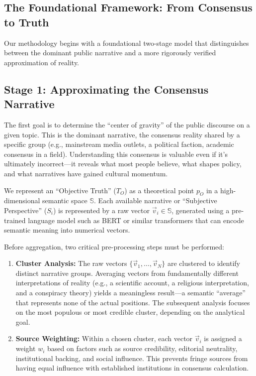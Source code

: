 \documentclass[11pt,a4paper]{article}
\begin{document}
\begin{small}
\section{The Foundational Framework: From Consensus to Truth}

Our methodology begins with a foundational two-stage model that distinguishes between the dominant public narrative and a more rigorously verified approximation of reality.

\subsection{Stage 1: Approximating the Consensus Narrative}

The first goal is to determine the ``center of gravity'' of the public discourse on a given topic. This is the dominant narrative, the consensus reality shared by a specific group (e.g., mainstream media outlets, a political faction, academic consensus in a field). Understanding this consensus is valuable even if it's ultimately incorrect---it reveals what most people believe, what shapes policy, and what narratives have gained cultural momentum.

We represent an ``Objective Truth'' ($T_O$) as a theoretical point $p_O$ in a high-dimensional semantic space $\mathbb{S}$. Each available narrative or ``Subjective Perspective'' ($S_i$) is represented by a raw vector $\vec{v}_i \in \mathbb{S}$, generated using a pre-trained language model such as BERT \citep{Devlin2018} or similar transformers that can encode semantic meaning into numerical vectors.

Before aggregation, two critical pre-processing steps must be performed:

\begin{enumerate}[leftmargin=*]
    \item \textbf{Cluster Analysis:} The raw vectors $\{\vec{v}_1, \ldots, \vec{v}_N\}$ are clustered to identify distinct narrative groups. Averaging vectors from fundamentally different interpretations of reality (e.g., a scientific account, a religious interpretation, and a conspiracy theory) yields a meaningless result---a semantic ``average'' that represents none of the actual positions. The subsequent analysis focuses on the most populous or most credible cluster, depending on the analytical goal.
    
    \item \textbf{Source Weighting:} Within a chosen cluster, each vector $\vec{v}_i$ is assigned a weight $w_i$ based on factors such as source credibility, editorial neutrality, institutional backing, and social influence. This prevents fringe sources from having equal influence with established institutions in consensus calculation.
\end{enumerate}


\end{small}
\end{document}
